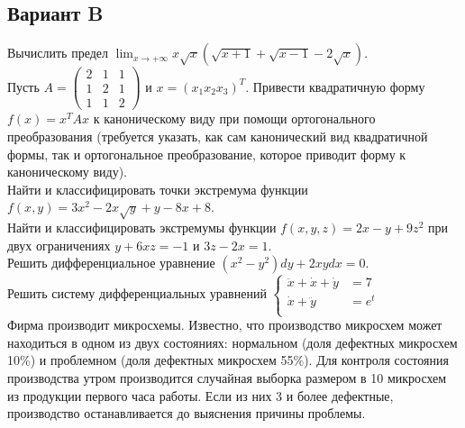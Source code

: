 \documentclass[addpoints, answers]{exam} %
\begin{document}
\subsection{Вариант B}
\begin{questions}
\question Вычислить предел $\lim_{x\to +\infty} x \sqrt{x}(\sqrt{x+1}+\sqrt{x-1}-2\sqrt{x})$.\\
\question  Пусть $A=
\left(\begin{array}{ccc}
2 & 1 & 1\\
1 & 2 & 1\\
1 & 1 & 2
\end{array}\right)$ и $x=(x_1 x_2 x_3)^T$. Привести квадратичную форму $f(x)=x^T Ax$ к каноническому виду при помощи ортогонального преобразования (требуется указать, как сам канонический вид квадратичной формы, так и ортогональное преобразование, которое приводит форму к каноническому виду).\\
\question  Найти и классифицировать точки экстремума функции $f(x,y)=3x^2-2x\sqrt{y}+y-8x+8$.\\
\question  Найти и классифицировать экстремумы функции $f(x,y,z)=2x-y+9z^2$ при двух ограничениях $y+6xz=-1$ и $3z-2x=1$.\\
\question  Решить дифференциальное уравнение $(x^2-y^2)dy + 2xydx=0$.\\
\question  Решить систему дифференциальных уравнений
$\left\{
\begin{aligned}
\ddot{x}+\dot{x}+\dot{y} & = 7\\
\dot{x}+\ddot{y}         & = e^t\\
\end{aligned}\right.$\\
\question  Фирма производит микросхемы. Известно, что производство микросхем может находиться в одном из двух состояниях: нормальном (доля дефектных микросхем 10\%) и проблемном (доля дефектных микросхем 55\%). Для контроля состояния производства утром производится случайная выборка размером в 10 микросхем из продукции первого часа работы. Если из них 3 и более дефектные, производство останавливается до выяснения причины проблемы.
\end{questions}
\end{document}
